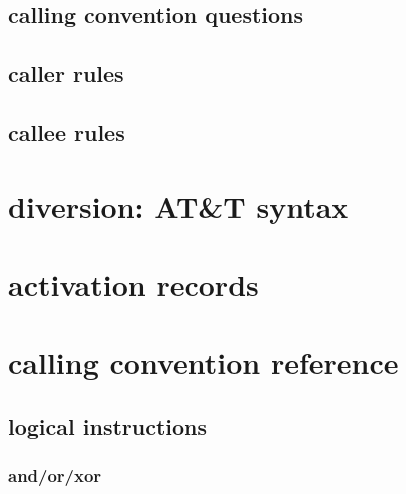 


\subsection{calling convention questions}


\subsection{caller rules}



\subsection{callee rules}

%












\section{diversion: AT&T syntax}



\section{activation records}


\section{calling convention reference}



\subsection{logical instructions}

\subsubsection{and/or/xor}

